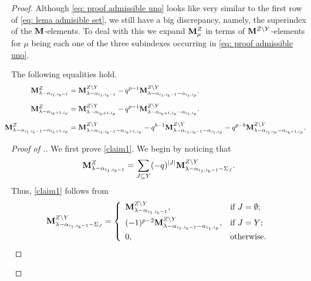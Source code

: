 \begin{proof}
 Although   \eqref{eq: proof admissible uno} looks like very similar to the first row of \eqref{eq: lema admisible set}, we still have a big discrepancy, namely,  the superindex of the $\mathbf{M}$-elements. 
 To deal with this we expand $\mathbf{M}^Z_\mu$ in terms of $\mathbf{M}^{Z\setminus Y}$-elements for $\mu$ being each one of the three subindexes occurring in \eqref{eq: proof admissible uno}. 


\begin{claim} \label{Claim admissible}
The following equalities hold.
\begin{align}
\hspace{-10pt} \label{claim1} \bfM_{\lambda - \alpha_{i_{1},i_{b}-1}}^{Z}   & = \bfM_{\lambda - \alpha_{i_{1},i_{b}-1}}^{Z\setminus Y} - q^{p-1} \bfM_{\lambda - \alpha_{i_{1},i_{b}-1}-\alpha_{i_{1},i_{p}}}^{Z\setminus Y}. \\[5pt]
\hspace{-10pt} \label{claim2} \bfM_{\lambda - \alpha_{i_{b}+1,i_{p}}}^{Z}    &  =  \bfM_{\lambda - \alpha_{i_{b}+1,i_{p}}}^{Z\setminus Y}-
 q^{p-1}\bfM_{\lambda - \alpha_{i_{b}+1,i_{p}} - \alpha_{i_{1},i_{p}}}^{Z\setminus Y}. \\[5pt]
\hspace{-10pt} \label{claim3}\bfM_{\lambda - \alpha_{i_{1},i_{b}-1} - \alpha_{i_{b}+1,i_{p}}}^{Z} & = \bfM_{\lambda - \alpha_{i_{1},i_{b}-1} - \alpha_{i_{b}+1,i_{p}}}^{Z\setminus Y} - q^{b-1}\bfM_{\lambda - \alpha_{i_{1},i_{b}-1} - \alpha_{i_{1},i_{p}}}^{Z\setminus Y} -q^{p-b}\bfM_{\lambda - \alpha_{i_{1},i_{p}} - \alpha_{i_{b}+1,i_{p}}}^{Z\setminus Y}.
\end{align}
\end{claim}

\begin{proof}[Proof of .]
We first prove \eqref{claim1}. We begin by noticing that 
\begin{equation}
    \mathbf{M}_{\lambda - \alpha_{i_{1},i_{b}-1}}^{Z}  = \sum_{J\subseteq Y} (-q)^{|J|} \mathbf{M}^{Z\setminus Y}_{\lambda - \alpha_{i_{1},i_{b}-1} -\Sigma_J}.
\end{equation}  
Thus,  \eqref{claim1} follows from 
  \begin{equation}\label{eq: sum proof admissible 2}
        \mathbf{M}_{\lambda - \alpha_{i_{1},i_{b}-1}-\Sigma_{J}}^{Z\setminus Y} = \left\{ \begin{array}{ll}
            \mathbf{M}_{\lambda - \alpha_{i_{1},i_{b}-1}}^{Z\setminus Y}, & \text{if } J=\emptyset; \\[5pt]
            (-1)^{p-2}\mathbf{M}_{\lambda - \alpha_{i_{1},i_{b}-1}-\alpha_{i_{1},i_{p}}}^{Z\setminus Y}, & \text{if } J = Y ;\\[5pt]
            0,&\text{otherwise}.
        \end{array}\right.
    \end{equation}


\end{proof}
\end{proof}
